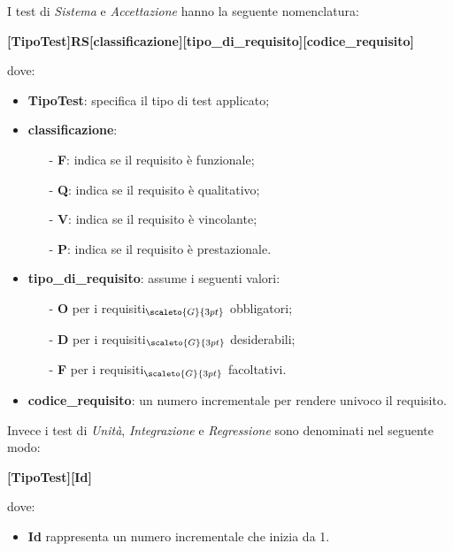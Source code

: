 I test di \textit{Sistema} e \textit{Accettazione} hanno la seguente nomenclatura:
\begin{center}
	\textbf{[TipoTest]RS[classificazione][tipo\_di\_requisito][codice\_requisito]}
\end{center}
dove:
\begin{itemize}
	\item \textbf{TipoTest}: specifica il tipo di test applicato;
	\item \textbf{classificazione}:
	\begin{itemize}
		\item[-] \textbf{F}: indica se il requisito è funzionale;
		\item[-] \textbf{Q}: indica se il requisito è qualitativo;
		\item[-] \textbf{V}: indica se il requisito è vincolante;
		\item[-] \textbf{P}: indica se il requisito è prestazionale.
	\end{itemize}
	\item \textbf{tipo\_di\_requisito}: assume i seguenti valori:
		\begin{itemize}
			\item[-] \textbf{O} per i requisiti$_{\scaleto{G}{3pt}}$ obbligatori;
			\item[-] \textbf{D} per i requisiti$_{\scaleto{G}{3pt}}$ desiderabili;
			\item[-] \textbf{F} per i requisiti$_{\scaleto{G}{3pt}}$ facoltativi.
		\end{itemize}
	\item \textbf{codice\_requisito}: un numero incrementale per rendere univoco il requisito.
\end{itemize}

Invece i test di \textit{Unità}, \textit{Integrazione} e \textit{Regressione} sono denominati nel seguente modo:
\begin{center}
	\textbf{[TipoTest][Id]}
\end{center}
dove:
\begin{itemize}
	\item \textbf{Id} rappresenta un numero incrementale che inizia da 1.
\end{itemize}

